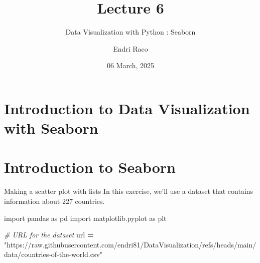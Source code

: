 \documentclass[
  ignorenonframetext,
]{beamer}
\title{Lecture 6}
\subtitle{Data Visualization with Python : Seaborn}
\author{Endri Raco}
\date{06 March, 2025}
\newenvironment{Shaded}{\begin{snugshade}}{\end{snugshade}}
\newcommand{\CommentTok}[1]{\textcolor[rgb]{0.56,0.35,0.01}{\textit{#1}}}
\newcommand{\ImportTok}[1]{#1}
\newcommand{\NormalTok}[1]{#1}
\newcommand{\OperatorTok}[1]{\textcolor[rgb]{0.81,0.36,0.00}{\textbf{#1}}}
\newcommand{\StringTok}[1]{\textcolor[rgb]{0.31,0.60,0.02}{#1}}
\begin{document}
\frame{\titlepage}

\begin{frame}[allowframebreaks]
  \tableofcontents[hideallsubsections]
\end{frame}
\section{Introduction to Data Visualization with
Seaborn}\label{introduction-to-data-visualization-with-seaborn}

\section{Introduction to Seaborn}\label{introduction-to-seaborn}

\begin{frame}[fragile]{Making a scatter plot with lists}
\label{making-a-scatter-plot-with-lists}
In this exercise, we'll use a dataset that contains information about
227 countries.


\begin{Shaded}
\begin{Highlighting}[]
\ImportTok{import}\NormalTok{ pandas }\ImportTok{as}\NormalTok{ pd}
\ImportTok{import}\NormalTok{ matplotlib.pyplot }\ImportTok{as}\NormalTok{ plt}

\CommentTok{\# URL for the dataset}
\NormalTok{url }\OperatorTok{=} \StringTok{"https://raw.githubusercontent.com/endri81/DataVisualization/refs/heads/main/data/countries{-}of{-}the{-}world.csv"}
\end{Highlighting}
\end{Shaded}
\end{frame}
\end{document}
